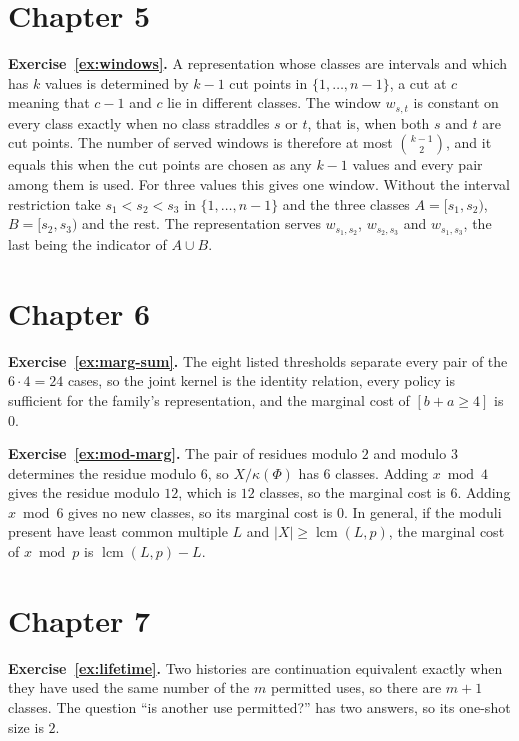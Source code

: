 \section*{Chapter 5}

\textbf{Exercise~\ref{ex:windows}.} A representation whose classes are intervals and which has $k$ values is determined by $k-1$ cut points in $\{1,\dots,n-1\}$, a cut at $c$ meaning that $c-1$ and $c$ lie in different classes. The window $w_{s,t}$ is constant on every class exactly when no class straddles $s$ or $t$, that is, when both $s$ and $t$ are cut points. The number of served windows is therefore at most $\binom{k-1}{2}$, and it equals this when the cut points are chosen as any $k-1$ values and every pair among them is used. For three values this gives one window. Without the interval restriction take $s_1<s_2<s_3$ in $\{1,\dots,n-1\}$ and the three classes $A=[s_1,s_2)$, $B=[s_2,s_3)$ and the rest. The representation serves $w_{s_1,s_2}$, $w_{s_2,s_3}$ and $w_{s_1,s_3}$, the last being the indicator of $A\cup B$.

\section*{Chapter 6}

\textbf{Exercise~\ref{ex:marg-sum}.} The eight listed thresholds separate every pair of the $6\cdot4=24$ cases, so the joint kernel is the identity relation, every policy is sufficient for the family's representation, and the marginal cost of $[b+a\ge4]$ is $0$.

\textbf{Exercise~\ref{ex:mod-marg}.} The pair of residues modulo $2$ and modulo $3$ determines the residue modulo $6$, so $X/\kappa(\Phi)$ has $6$ classes. Adding $x\bmod4$ gives the residue modulo $12$, which is $12$ classes, so the marginal cost is $6$. Adding $x\bmod6$ gives no new classes, so its marginal cost is $0$. In general, if the moduli present have least common multiple $L$ and $|X|\ge\operatorname{lcm}(L,p)$, the marginal cost of $x\bmod p$ is $\operatorname{lcm}(L,p)-L$.

\section*{Chapter 7}

\textbf{Exercise~\ref{ex:lifetime}.} Two histories are continuation equivalent exactly when they have used the same number of the $m$ permitted uses, so there are $m+1$ classes. The question ``is another use permitted?'' has two answers, so its one-shot size is $2$.

